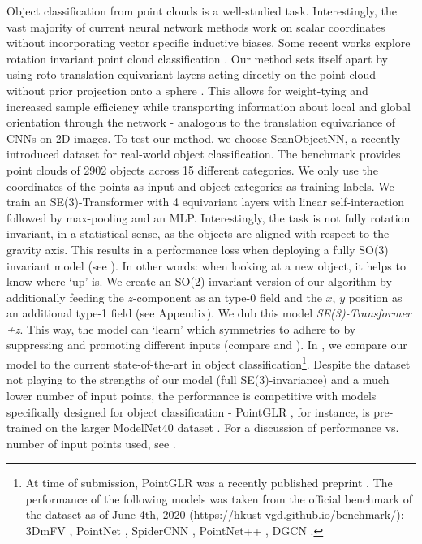 Object classification from point clouds is a well-studied task. Interestingly, the vast majority of current neural network methods work on scalar coordinates without incorporating vector specific inductive biases. Some recent works explore rotation invariant point cloud classification \cite{You2019,zhang2019rotation,ClusterNet,RaoFractal}. Our method sets itself apart by using roto-translation equivariant layers acting directly on the point cloud without prior projection onto a sphere \cite{RaoFractal,You2019,cohen2018spherical}. This allows for weight-tying and increased sample efficiency while transporting information about local and global orientation through the network - analogous to the translation equivariance of CNNs on 2D images. To test our method, we choose ScanObjectNN, a recently introduced dataset for real-world object classification. 
The benchmark provides point clouds of 2902 objects across 15 different categories. We only use the coordinates of the points as input and object categories as training labels. We train an SE(3)-Transformer with 4 equivariant layers with linear self-interaction followed by max-pooling and an MLP. Interestingly, the task is not fully rotation invariant, in a statistical sense, as the objects are aligned with respect to the gravity axis. This results in a performance loss when deploying a fully SO(3) invariant model (see ). In other words: when looking at a new object, it helps to know where `up' is.
We create an SO(2) invariant version of our algorithm by additionally feeding the $z$-component as an type-0 field and the $x$, $y$ position as an additional type-1 field (see Appendix). We dub this model \textit{SE(3)-Transformer +z}. This way, the model can `learn' which symmetries to adhere to by suppressing and promoting different inputs (compare  and ). In , we compare our model to the current state-of-the-art in object classification\footnote{At time of submission, PointGLR was a recently published preprint \citep{PointGLR}. The performance of the following models was taken from the official benchmark of the dataset as of June 4th, 2020 (\url{https://hkust-vgd.github.io/benchmark/}): 3DmFV \citep{3dmfv}, PointNet \citep{Pointnet}, SpiderCNN \citep{SpiderCNN}, PointNet++ \citep{Pointnetpp}, DGCN \citep{DGCNN}.}. Despite the dataset not playing to the strengths of our model (full SE(3)-invariance) and a much lower number of input points, the performance is competitive with models specifically designed for object classification - PointGLR \citep{PointGLR}, for instance, is pre-trained on the larger ModelNet40 dataset \citep{modelnet40}. For a discussion of performance vs. number of input points used, see .


